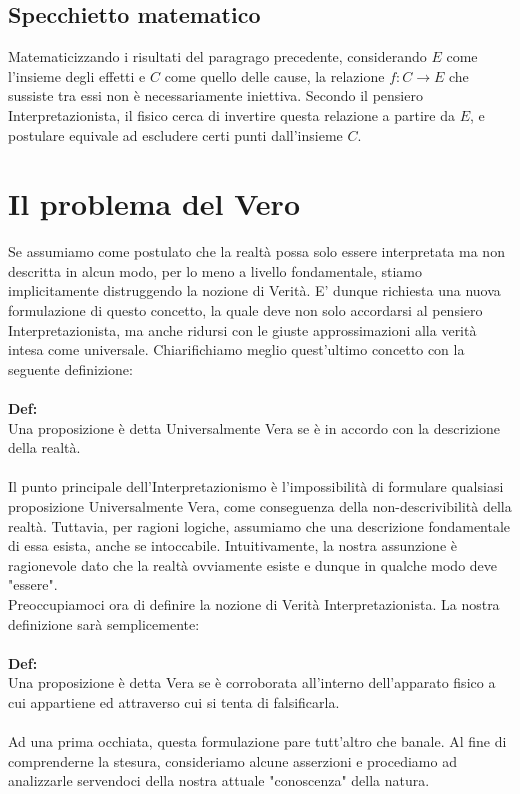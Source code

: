 \documentclass[]{article}
\begin{document}
	\subsection{Specchietto matematico}
	Matematicizzando i risultati del paragrago precedente, considerando $E$ come l'insieme degli effetti e $C$ come quello delle cause, la relazione $f:C\rightarrow E$ che sussiste tra essi non è necessariamente iniettiva. Secondo il pensiero Interpretazionista, il fisico cerca di invertire questa relazione a partire da $E$, e postulare equivale ad escludere certi punti dall'insieme $C$.
	\section{Il problema del Vero}
	Se assumiamo come postulato che la realtà possa solo essere interpretata ma non descritta in alcun modo, per lo meno a livello fondamentale, stiamo implicitamente distruggendo la nozione di Verità. E' dunque richiesta  una nuova formulazione di questo concetto, la quale deve non solo accordarsi al pensiero Interpretazionista, ma anche ridursi con le giuste approssimazioni alla verità intesa come universale.
	Chiarifichiamo meglio quest'ultimo concetto con la seguente definizione:\\\\
	\textbf{Def:}\\
	Una proposizione è detta Universalmente Vera se è in accordo con la descrizione della realtà.\\
	\\
	Il punto principale dell'Interpretazionismo è l'impossibilità di formulare qualsiasi proposizione Universalmente Vera, come conseguenza della non-descrivibilità della realtà. Tuttavia, per ragioni logiche, assumiamo che una descrizione fondamentale di essa esista, anche se intoccabile. Intuitivamente, la nostra assunzione è ragionevole dato che la realtà ovviamente esiste e dunque in qualche modo deve "essere". \\
	Preoccupiamoci ora di definire la nozione di Verità Interpretazionista. La nostra definizione sarà semplicemente:\\
	\\
	\textbf{Def:}\\
	Una proposizione è detta Vera se è corroborata all'interno dell'apparato fisico a cui appartiene ed attraverso cui si tenta di falsificarla.\\
	\\
	Ad una prima occhiata, questa formulazione pare tutt'altro che banale. Al fine di comprenderne la stesura, consideriamo alcune asserzioni e procediamo ad analizzarle servendoci della nostra attuale "conoscenza" della natura.\\
\end{document}
